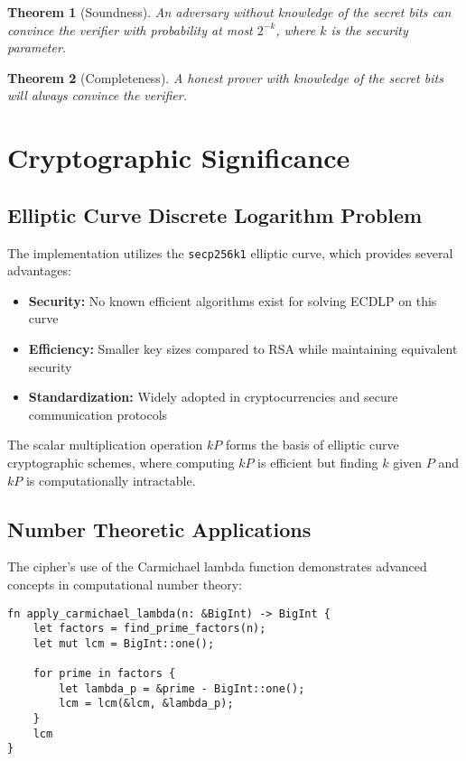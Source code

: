 \documentclass[12pt,a4paper]{article}
\newtheorem{theorem}{Theorem}[section]
\begin{document}
\begin{theorem}[Soundness]
An adversary without knowledge of the secret bits can convince the verifier with probability at most $2^{-k}$, where $k$ is the security parameter.
\end{theorem}

\begin{theorem}[Completeness]
A honest prover with knowledge of the secret bits will always convince the verifier.
\end{theorem}

\section{Cryptographic Significance}

\subsection{Elliptic Curve Discrete Logarithm Problem}

The implementation utilizes the \texttt{secp256k1} elliptic curve, which provides several advantages:

\begin{itemize}
    \item \textbf{Security:} No known efficient algorithms exist for solving ECDLP on this curve
    \item \textbf{Efficiency:} Smaller key sizes compared to RSA while maintaining equivalent security
    \item \textbf{Standardization:} Widely adopted in cryptocurrencies and secure communication protocols
\end{itemize}

The scalar multiplication operation $kP$ forms the basis of elliptic curve cryptographic schemes, where computing $kP$ is efficient but finding $k$ given $P$ and $kP$ is computationally intractable.

\subsection{Number Theoretic Applications}

The cipher's use of the Carmichael lambda function demonstrates advanced concepts in computational number theory:

\begin{lstlisting}[caption={Carmichael Lambda Function Implementation}]
fn apply_carmichael_lambda(n: &BigInt) -> BigInt {
    let factors = find_prime_factors(n);
    let mut lcm = BigInt::one();
    
    for prime in factors {
        let lambda_p = &prime - BigInt::one();
        lcm = lcm(&lcm, &lambda_p);
    }
    lcm
}
\end{lstlisting}
\end{document}
